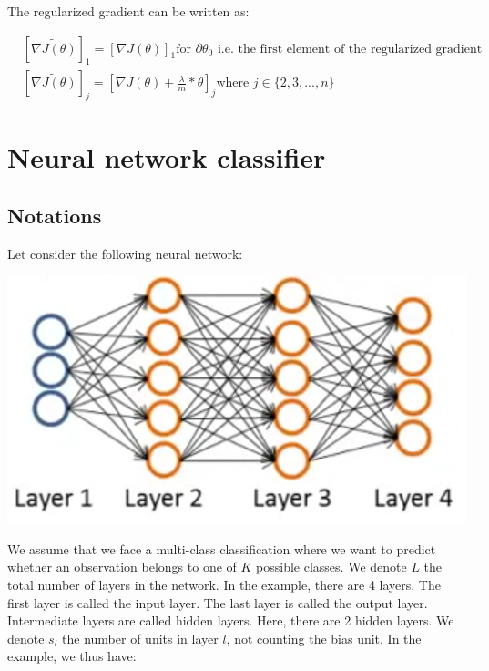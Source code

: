 \documentclass[a4paper, 12pt]{article}
\begin{document}
The regularized gradient can be written as:

\begin{align*}
& {\left [ \widetilde{\nabla J(\theta)} \right]}_{1} = {\left [ \nabla J(\theta) \right]}_{1} \text{for } \partial \theta_{0} \text{ i.e. the first element of the regularized gradient} \\
& {\left [ \widetilde{\nabla J(\theta)} \right]}_{j} = {\left [ \nabla J(\theta) + \frac{\lambda}{m}*\theta \right]}_{j} \text{where } j \in \{2, 3, ..., n\}
\end{align*}

\section{Neural network classifier}
\subsection{Notations}

Let consider the following neural network:

\begin{center}
  \includegraphics{neural}
  \label{fig:neural}
\end{center}

We assume that we face a multi-class classification where we want to predict whether an observation belongs to one of $K$ possible classes. We denote $L$ the total number of layers in the network. In the example, there are 4 layers. The first layer is called the input layer. The last layer is called the output layer. Intermediate layers are called hidden layers. Here, there are 2 hidden layers. We denote $s_{l}$ the number of units in layer $l$, not counting the bias unit. In the example, we thus have:
\end{document}
